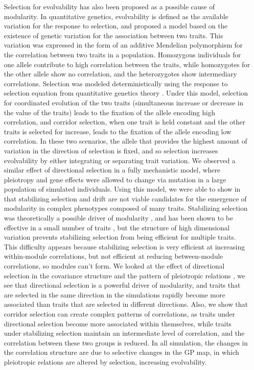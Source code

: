 \begin{refsection}
Selection for evolvability has
also been proposed as a possible cause of modularity. In quantitative
genetics, evolvability is defined as the available variation for the
response to selection, and \textcite{Pavlicev2011-wz}
proposed a model based on the existence of genetic variation for the
association between two traits. This variation was expressed in the form
of an additive Mendelian polymorphism for the correlation between two
traits in a population. Homozygous individuals for one allele contribute
to high correlation between the traits, while homozygotes for the other
allele show no correlation, and the heterozygotes show intermediary
correlations. Selection was modeled deterministically using the response
to selection equation from quantitative genetics theory
\parencite{Lande1979-by}. Under this model, selection for coordinated
evolution of the two traits (simultaneous increase or decrease in the
value of the traits) leads to the fixation of the allele encoding high
correlation, and corridor selection, when one trait is held constant and
the other traits is selected for increase, leads to the fixation of the
allele encoding low correlation. In these two scenarios, the allele that
provides the highest amount of variation in the direction of selection
is fixed, and so selection increases evolvability by either integrating
or separating trait variation. We observed a similar effect of
directional selection in a fully mechanistic model, where pleiotropy and
gene effects were allowed to change via mutation in a large population
of simulated individuals. Using this model, we were able to show in
\textcite{Melo2015-bk} that stabilizing selection and drift are not viable
candidates for the emergence of modularity in complex phenotypes
composed of many traits. Stabilizing selection was theoretically a
possible driver of modularity \parencite{Lande1980-kn, Cheverud1984-mi}, and
has been shown to be effective in a small number of traits
\parencite{Jones2007-xe, Jones2014-wj}, but the structure of high
dimensional variation prevents stabilizing selection from being
efficient for multiple traits. This difficulty appears because
stabilizing selection is very efficient at increasing within-module
correlations, but not efficient at reducing between-module correlations,
so modules can't form. We looked at the effect of directional selection
in the covariance structure and the pattern of pleiotropic relations
\parencite{Melo2016-yw}, we see that directional selection is a powerful
driver of modularity, and traits that are selected in the same direction
in the simulations rapidly become more associated than traits that are
selected in different directions. Also, we show that corridor selection
can create complex patterns of correlations, as traits under directional
selection become more associated within themselves, while traits under
stabilizing selection maintain an intermediate level of correlation, and
the correlation between these two groups is reduced. In all simulation,
the changes in the correlation structure are due to selective changes in
the GP map, in which pleiotropic relations are altered by selection,
increasing evolvability.


\end{refsection}
